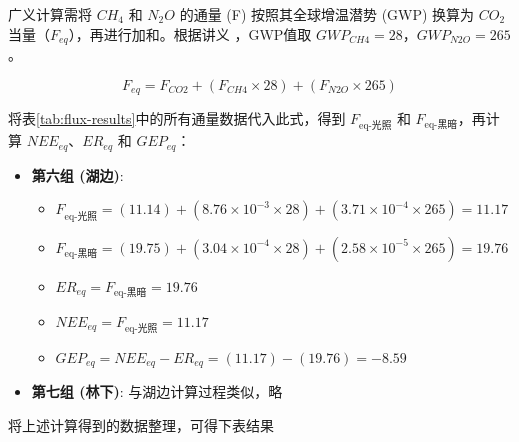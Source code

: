 \documentclass[10.5pt]{config}
\begin{document}
    广义计算需将 $CH_4$ 和 $N_2O$ 的通量 (F) 按照其全球增温潜势 (GWP) 换算为 $CO_2$ 当量（$F_{eq}$），再进行加和。根据讲义 ，GWP值取 $GWP_{CH4} = 28$，$GWP_{N2O} = 265$。
    
    \begin{equation*}
        F_{eq} = F_{CO2} + (F_{CH4} \times 28) + (F_{N2O} \times 265)
    \end{equation*}
    
    将表\ref{tab:flux-results}中的所有通量数据代入此式，得到 $F_{\text{eq-光照}}$ 和 $F_{\text{eq-黑暗}}$，再计算 $NEE_{eq}$、$ER_{eq}$ 和 $GEP_{eq}$：

    \begin{itemize}[leftmargin=*]
        \item \textbf{第六组 (湖边)}:
            \begin{itemize}
                \item $F_{\text{eq-光照}} = (11.14) + (8.76 \times 10^{-3} \times 28) + (3.71 \times 10^{-4} \times 265) = 11.17$
                \item $F_{\text{eq-黑暗}} = (19.75) + (3.04 \times 10^{-4} \times 28) + (2.58 \times 10^{-5} \times 265) = 19.76$
            \end{itemize}
            \begin{itemize}
                \item $ER_{eq} = F_{\text{eq-黑暗}} = 19.76$
                \item $NEE_{eq} = F_{\text{eq-光照}} = 11.17$
                \item $GEP_{eq} = NEE_{eq} - ER_{eq} = (11.17) - (19.76) = -8.59$
            \end{itemize}
            
        \item \textbf{第七组 (林下)}:
            与湖边计算过程类似，略
    \end{itemize}

将上述计算得到的数据整理，可得下表结果
\end{document}
